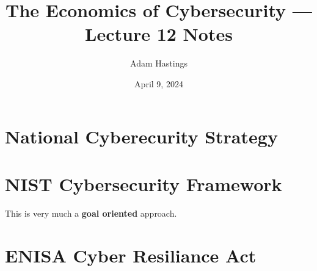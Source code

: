 \documentclass[11pt]{article}
\title{The Economics of Cybersecurity --- Lecture 12 Notes}
\date{April 9, 2024}
\author{Adam Hastings}
\begin{document}
\maketitle

\section{National Cyberecurity Strategy}

\section{NIST Cybersecurity Framework}

This is very much a {\bf goal oriented} approach.

\section{ENISA Cyber Resiliance Act}
\end{document}
